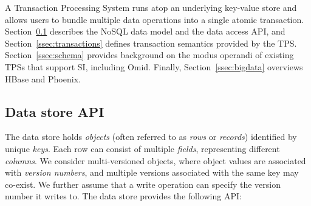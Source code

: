 A Transaction Processing System runs atop an underlying 
key-value store and allows users to bundle multiple data operations 
into a single atomic transaction. Section~\ref{ssec:data-model} describes the NoSQL data 
model and the data access API, and  Section~\ref{ssec:transactions} defines transaction semantics
provided by the TPS. Section~\ref{ssec:schema} provides  background on the modus operandi 
of existing TPSs that support SI,  including Omid. Finally, Section~\ref{ssec:bigdata} overviews HBase and Phoenix. 

\subsection{Data store API}
\label{ssec:data-model}

The  data store holds  \emph{objects} (often referred to as \emph{rows} or {\em records}) identified by unique \emph{keys}.
Each row can consist of multiple \emph{fields}, representing different \emph{columns}. 
We consider multi-versioned objects, where object values are associated with \emph{version numbers}, and
multiple versions associated with the same key may co-exist. {}
We further assume that a write operation can specify the version number it writes to.
The  data store provides the following API:
